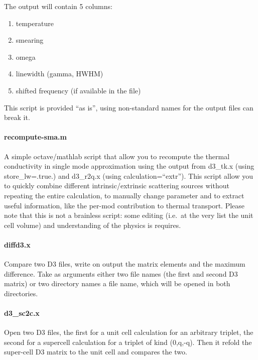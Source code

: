 \documentclass[
]{article}
\providecommand{\tightlist}{%
  \setlength{\itemsep}{0pt}\setlength{\parskip}{0pt}}
\begin{document}
The output will contain 5 columns:

\begin{enumerate}
\def\labelenumi{\arabic{enumi}.}
\tightlist
\item
  temperature
\item
  smearing
\item
  omega
\item
  linewidth (gamma, HWHM)
\item
  shifted frequency (if available in the file)
\end{enumerate}

This script is provided \enquote{as is}, using non-standard names for
the output files can break it.

\hypertarget{recompute-sma.m}{%
\paragraph{recompute-sma.m}\label{recompute-sma.m}}

A simple octave/mathlab script that allow you to recompute the thermal
conductivity in single mode approximation using the output from d3\_tk.x
(using store\_lw=.true.) and d3\_r2q.x (using
calculation=\enquote{extr}). This script allow you to quickly combine
different intrinsic/extrinsic scattering sources without repeating the
entire calculation, to manually change parameter and to extract useful
information, like the per-mod contribution to thermal transport. Please
note that this is not a brainless script: some editing (i.e.~at the very
list the unit cell volume) and understanding of the physics is requires.

\hypertarget{diffd3.x}{%
\paragraph{diffd3.x}\label{diffd3.x}}

Compare two D3 files, write on output the matrix elements and the
maximum difference. Take as arguments either two file names (the first
and second D3 matrix) or two directory names a file name, which will be
opened in both directories.

\hypertarget{d3_sc2c.x}{%
\paragraph{d3\_sc2c.x}\label{d3_sc2c.x}}

Open two D3 files, the first for a unit cell calculation for an
arbitrary triplet, the second for a supercell calculation for a triplet
of kind (0,q,-q). Then it refold the super-cell D3 matrix to the unit
cell and compares the two.
\end{document}
